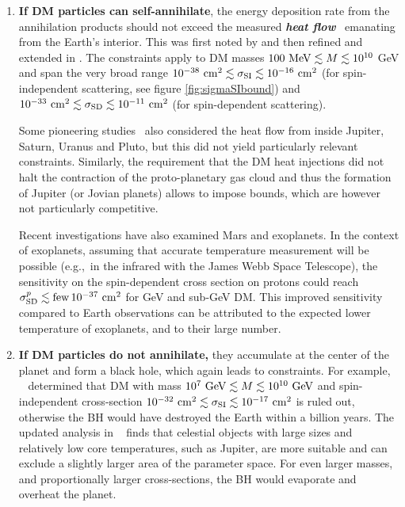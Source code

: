 \begin{enumerate}
\item {\bf If DM particles can self-annihilate}, 
the energy deposition rate from the annihilation products should not exceed the measured {\bf {\em heat flow}} \, emanating from the Earth's interior. 
This was first noted by  and then refined and extended in . The constraints apply to DM masses $100 \ {\rm MeV} \lesssim M \lesssim 10^{10}$ GeV and span the very broad range $10^{-38} \ {\rm cm}^2 \lesssim \sigma_{\rm SI} \lesssim 10^{-16} \ {\rm cm}^2$ (for spin-independent scattering, see figure \ref{fig:sigmaSIbound}) and $10^{-33} \ {\rm cm}^2 \lesssim \sigma_{\rm SD} \lesssim 10^{-11} \ {\rm cm}^2$ (for spin-dependent scattering). 

Some pioneering studies~\cite{DMandplanets} also considered the heat flow from inside Jupiter, Saturn, Uranus and Pluto, 
but this did not yield particularly relevant constraints.
Similarly, the requirement that the DM heat injections did not halt the contraction of the proto-planetary gas cloud and thus the formation of Jupiter (or Jovian planets) allows to impose bounds, which are however not particularly competitive.

Recent investigations have also examined Mars and exoplanets. 
In the context of exoplanets, assuming that accurate temperature measurement will be possible (e.g.,~in the infrared with the James Webb Space Telescope), the sensitivity on the spin-dependent cross section on protons could reach $\sigma_{\rm SD}^p \lesssim {\rm few} \, 10^{-37} \ {\rm cm}^2$ for GeV and sub-GeV DM. 
This improved sensitivity compared to Earth observations can be attributed to the expected lower temperature of exoplanets, and to their large number. 


\item {\bf If DM particles do not annihilate,} they accumulate at the center of the planet and form a black hole, which again leads to constraints. For example, ~\cite{DMandplanets} determined  that DM with mass $10^7 \ {\rm GeV} \lesssim M \lesssim 10^{10} \ {\rm GeV}$ and spin-independent cross-section $10^{-32} \ {\rm cm}^2 \lesssim \sigma_{\rm SI} \lesssim 10^{-17} \ {\rm cm}^2$ is ruled out, otherwise the BH would have destroyed the Earth within a billion years. 
The updated analysis in ~\cite{DMandplanets} finds that celestial objects with large sizes and relatively low core temperatures, such as Jupiter, are more suitable and can exclude a slightly larger area of the parameter space. For even larger masses, and proportionally larger cross-sections, the BH would evaporate and overheat the planet. 

\end{enumerate}

